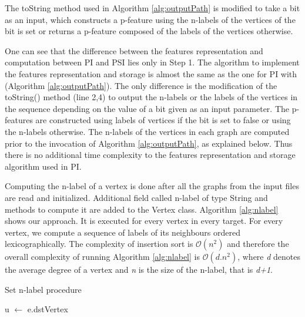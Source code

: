 \documentclass{l4proj}
\begin{document}
The toString method used in Algorithm \ref{alg:outputPath} is modified to take a bit as an input, which constructs a p-feature using the n-labels of the vertices of the bit is set or returns a p-feature composed of the labels of the vertices otherwise.

One can see that the difference between the features representation and computation between PI and PSI lies only in Step 1. The algorithm to implement the features representation and storage is almost the same as the one for PI with (Algorithm \ref{alg:outputPath}). The only difference is the modification of the toString() method (line 2,4) to output the n-labels or the labels of the vertices in the sequence depending on the value of a bit given as an input parameter. The p-features are constructed using labels of vertices if the bit is set to false or using the n-labels otherwise. The n-labels of the vertices in each graph are computed prior to the invocation of Algorithm \ref{alg:outputPath}, as explained below. Thus there is no additional time complexity to the features representation and storage algorithm used in PI.

Computing the n-label of a vertex is done after all the graphs from the input files are read and initialized. Additional field called n-label of type String and methods to compute it are added to the Vertex class. Algorithm \ref{alg:nlabel} shows our approach. It is executed for every vertex in every target. For every vertex, we compute a sequence of labels of its neighbours ordered lexicographically. The complexity of insertion sort is $\mathcal{O}(n^{2})$ \cite{backtracking-algorithms} and therefore the overall complexity of running Algorithm \ref{alg:nlabel} is $\mathcal{O}(d.n^{2})$, where \emph{d} denotes the average degree of a vertex and \emph{n} is the size of the n-label, that is \emph{d+1}.
 
\begin{algorithm}
\centering
\caption{Set n-label procedure}
\label{alg:nlabel}
\begin{algorithmic}[1]
\State u $\gets$ e.dstVertex
\State {} 
\EndFor
\EndProcedure
{} 
\end{algorithmic}
\end{algorithm}
\end{document}
